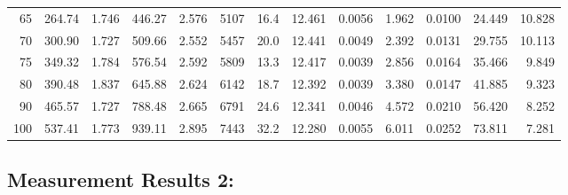 \documentclass[10pt]{article}
\begin{document}
{\begin{tabular}{|r|rr|rr|rr|rr|rr|r|r|}
       65 &       264.74 &        1.746 &       446.27 &        2.576 &         5107 &         16.4 &       12.461 &       0.0056 &        1.962 &       0.0100 &       24.449 &       10.828 \\
       70 &       300.90 &        1.727 &       509.66 &        2.552 &         5457 &         20.0 &       12.441 &       0.0049 &        2.392 &       0.0131 &       29.755 &       10.113 \\
       75 &       349.32 &        1.784 &       576.54 &        2.592 &         5809 &         13.3 &       12.417 &       0.0039 &        2.856 &       0.0164 &       35.466 &        9.849 \\
       80 &       390.48 &        1.837 &       645.88 &        2.624 &         6142 &         18.7 &       12.392 &       0.0039 &        3.380 &       0.0147 &       41.885 &        9.323 \\
       90 &       465.57 &        1.727 &       788.48 &        2.665 &         6791 &         24.6 &       12.341 &       0.0046 &        4.572 &       0.0210 &       56.420 &        8.252 \\
      100 &       537.41 &        1.773 &       939.11 &        2.895 &         7443 &         32.2 &       12.280 &       0.0055 &        6.011 &       0.0252 &       73.811 &        7.281 \\
\hline
\end{tabular}
}



\subsection*{\large \bf Measurement Results 2:}
\end{document}
